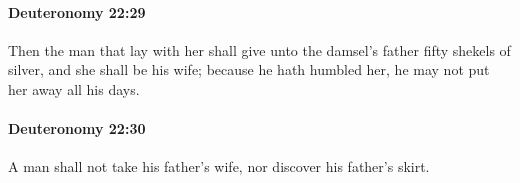 		\paragraph{Deuteronomy 22:29} %
			\label{DEUTERONOMY-22-29}

			Then the man that lay with her shall give unto the damsel's father fifty shekels of silver, and she shall be his wife; because he hath humbled her, he may not put her away all his days.


		\paragraph{Deuteronomy 22:30} %
			\label{DEUTERONOMY-22-30}

			A man shall not take his father's wife, nor discover his father's skirt.

